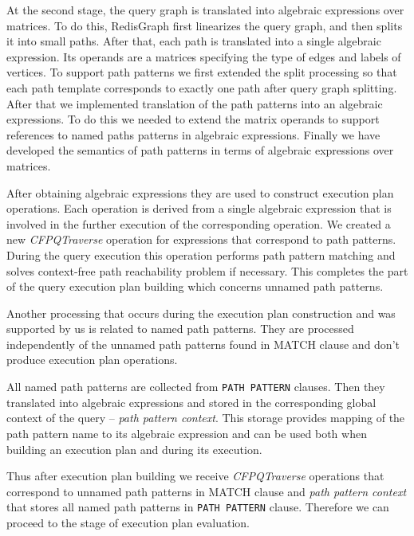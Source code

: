 At the second stage, the query graph is translated into algebraic expressions over matrices. To do this, RedisGraph first linearizes the query graph, and then splits it into small paths. After that, each path is translated into a single algebraic expression. Its operands are a matrices specifying the type of edges and labels of vertices. To support path patterns we first extended the split processing so that each path template corresponds to exactly one path after query graph splitting. After that we implemented translation of the path patterns into an algebraic expressions. To do this we needed to extend the matrix operands to support references to named paths patterns in algebraic expressions. Finally we have developed the semantics of path patterns in terms of algebraic expressions over matrices.

After obtaining algebraic expressions they are used to construct execution plan operations. Each operation is derived from a single algebraic expression that is involved in the further execution of the corresponding operation. We created a new \textit{CFPQTraverse} operation for expressions that correspond to path patterns. During the query execution this operation performs path pattern matching and solves context-free path reachability problem if necessary. This completes the part of the query execution plan building which concerns unnamed path patterns.


Another processing that occurs during the execution plan construction and was supported by us is related to named path patterns. They are processed independently of the unnamed path patterns found in MATCH clause and don't produce execution plan operations. 

All named path patterns are collected from \lstinline{PATH PATTERN} clauses. Then they translated into algebraic expressions and stored in the corresponding global context of the query -- \textit{path pattern context}. This storage provides mapping of the path pattern name to its algebraic expression and can be used both when building an execution plan and during its execution.

Thus after execution plan building we receive \textit{CFPQTraverse} operations that correspond to unnamed path patterns in MATCH clause and \textit{path pattern context} that stores all named path patterns in \lstinline{PATH PATTERN} clause. Therefore we can proceed to the stage of execution plan evaluation.

